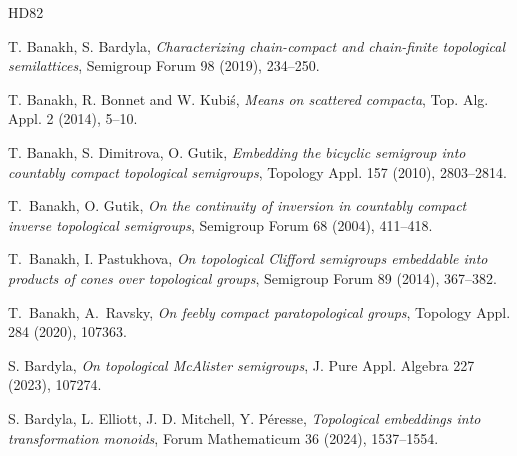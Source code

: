 \documentclass[12pt, twoside, leqno]{article}
\theoremstyle{definition}
\numberwithin{equation}{section}
\begin{document}
\begin{thebibliography}{HD82}




\normalsize
\baselineskip=17pt




T. Banakh, S. Bardyla, {\em Characterizing chain-compact and chain-finite topological semilattices}, Semigroup Forum 98 (2019), 234--250. 



T. Banakh, R. Bonnet and W. Kubi\'s, {\em Means on scattered compacta}, Top. Alg. Appl. 2 (2014), 5--10.

T. Banakh, S. Dimitrova, O. Gutik, {\em Embedding the bicyclic semigroup into countably compact topological semigroups}, Topology Appl. 157 (2010), 2803--2814.

 T.~Banakh, O. Gutik, {\em  On the continuity of inversion in countably compact inverse topological semigroups}, Semigroup Forum 68 (2004), 411--418.

 T.~Banakh, I. Pastukhova, {\em  On topological Clifford semigroups embeddable into products of cones over topological groups}, Semigroup Forum 89 (2014), 367--382.


 T.~Banakh, A.~Ravsky, {\em  On feebly compact paratopological groups}, Topology Appl. 284 (2020), 107363.

S. Bardyla, {\em On topological McAlister semigroups}, J. Pure Appl. Algebra 227 (2023), 107274.

S. Bardyla, L. Elliott, J. D. Mitchell, Y. P\'{e}resse, {\em Topological embeddings into transformation monoids}, Forum Mathematicum  36  (2024), 1537--1554.




\end{thebibliography}
\end{document}
